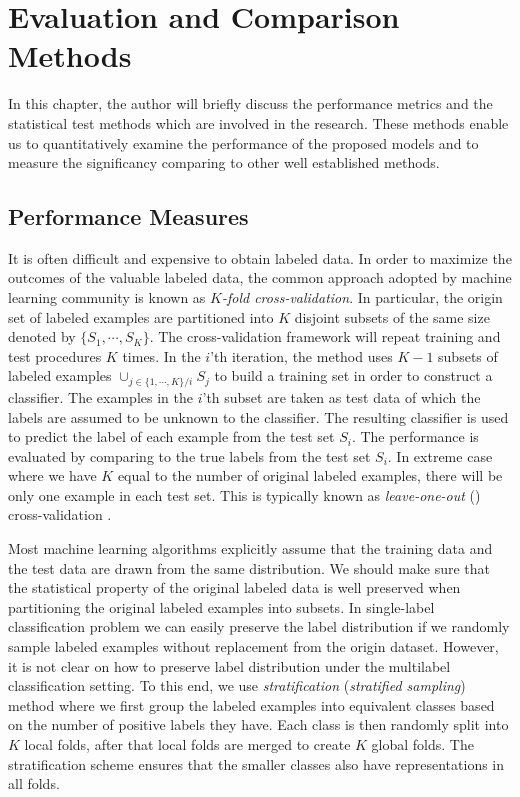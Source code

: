 {%
%
\iffalse
\chapter{Evaluation and Comparison Methods} \label{ch_ecm}

In this chapter, the author will briefly discuss the performance metrics and the statistical test methods which are involved in the research. 
These methods enable us to quantitatively examine the performance of the proposed models and to measure the significancy comparing to other well established methods.

%
\section{Performance Measures} \label{sc_pm}

It is often difficult and expensive to obtain labeled data. 
In order to maximize the outcomes of the valuable labeled data, the common approach adopted by machine learning community is known as \textit{$K$-fold cross-validation}.
In particular, the origin set of labeled examples are partitioned into $K$ disjoint subsets of the same size denoted by $\{S_1,\cdots,S_K\}$.
The cross-validation framework will repeat training and test procedures $K$ times.
In the $i$'th iteration, the method uses $K-1$ subsets of labeled examples $\cup_{j\in\{1,\cdots,K\}/i}S_j$ to build a training set in order to construct a classifier.
The examples in the $i$'th subset are taken as test data of which the labels are assumed to be unknown to the classifier.
The resulting classifier is used to predict the label of each example from the test set $S_i$.
The performance is evaluated by comparing to the true labels from the test set $S_i$.
In extreme case where we have $K$ equal to the number of original labeled examples, there will be only one example in each test set.
This is typically known as \textit{leave-one-out} (\loo) {cross-validation} .

Most machine learning algorithms explicitly assume that the training data and the test data are drawn from the same distribution.
We should make sure that the statistical property of the original labeled data is well preserved when partitioning the original labeled examples into subsets.
In single-label classification problem we can easily preserve the label distribution if we randomly sample labeled examples without replacement from the origin dataset.
However, it is not clear on how to preserve label distribution under the multilabel classification setting.
To this end, we use \textit{stratification} (\textit{stratified sampling}) method where we first group the labeled examples into equivalent classes based on the number of positive labels they have. 
Each class is then randomly split into $K$ local folds, after that local folds are merged to create $K$ global folds.
The stratification scheme ensures that the smaller classes also have representations in all folds. 

}

